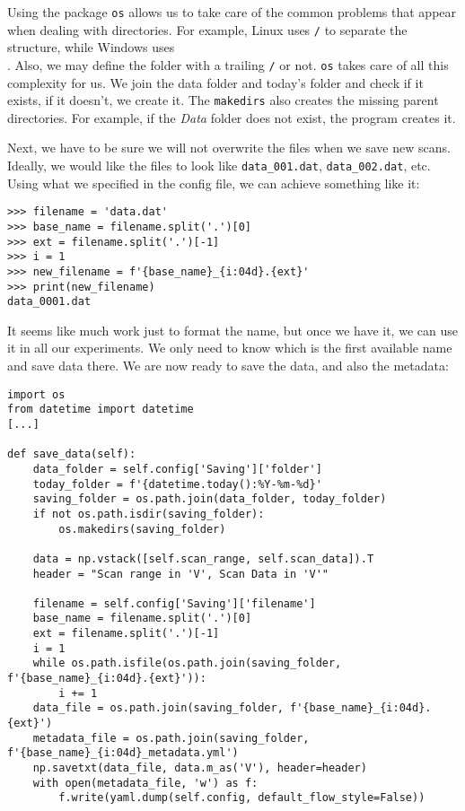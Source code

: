 Using the package \texttt{os} allows us to take care of the common problems that appear when dealing with directories. For example, Linux uses \texttt{/} to separate the structure, while Windows uses \texttt{\\}. Also, we may define the folder with a trailing \texttt{/} or not. \texttt{os} takes care of all this complexity for us. We join the data folder and today's folder and check if it exists, if it doesn't, we create it. The \texttt{makedirs} also creates the missing parent directories. For example, if the \emph{Data} folder does not exist, the program creates it.

Next, we have to be sure we will not overwrite the files when we save new scans. Ideally, we would like the files to look like \texttt{data\_001.dat}, \texttt{data\_002.dat}, etc. Using what we specified in the config file, we can achieve something like it:

\begin{verbatim}
>>> filename = 'data.dat'
>>> base_name = filename.split('.')[0]
>>> ext = filename.split('.')[-1]
>>> i = 1
>>> new_filename = f'{base_name}_{i:04d}.{ext}'
>>> print(new_filename)
data_0001.dat
\end{verbatim}

It seems like much work just to format the name, but once we have it, we can use it in all our experiments. We only need to know which is the first available name and save data there. We are now ready to save the data, and also the metadata:

\begin{verbatim}
import os
from datetime import datetime
[...]

def save_data(self):
    data_folder = self.config['Saving']['folder']
    today_folder = f'{datetime.today():%Y-%m-%d}'
    saving_folder = os.path.join(data_folder, today_folder)
    if not os.path.isdir(saving_folder):
        os.makedirs(saving_folder)

    data = np.vstack([self.scan_range, self.scan_data]).T
    header = "Scan range in 'V', Scan Data in 'V'"

    filename = self.config['Saving']['filename']
    base_name = filename.split('.')[0]
    ext = filename.split('.')[-1]
    i = 1
    while os.path.isfile(os.path.join(saving_folder, f'{base_name}_{i:04d}.{ext}')):
        i += 1
    data_file = os.path.join(saving_folder, f'{base_name}_{i:04d}.{ext}')
    metadata_file = os.path.join(saving_folder, f'{base_name}_{i:04d}_metadata.yml')
    np.savetxt(data_file, data.m_as('V'), header=header)
    with open(metadata_file, 'w') as f:
        f.write(yaml.dump(self.config, default_flow_style=False))
\end{verbatim}

